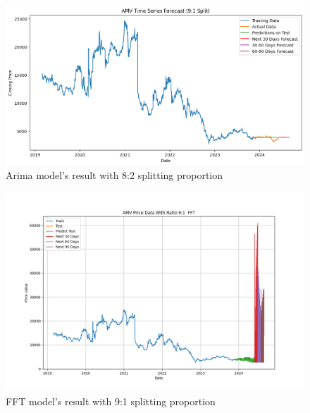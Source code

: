 \documentclass{ieeeojies}
\begin{document}
\begin{figure}[H]
  \centering
  \begin{minipage}{0.8\linewidth}
    \centering
    \includegraphics[width=\linewidth]{bibliography/Figure/AMV_ARIMA.png}
    \caption{Arima model's result with 8:2 splitting proportion}
    \label{fig8}
  \end{minipage}
\end{figure}

\begin{figure}[H]
  \centering
  \begin{minipage}{0.8\linewidth}
    \centering
    \includegraphics[width=\linewidth]{bibliography/Figure/FFT_91_AMV.png}
    \caption{FFT model's result with 9:1 splitting proportion}
    \label{fig8}
  \end{minipage}
\end{figure}
\end{document}
